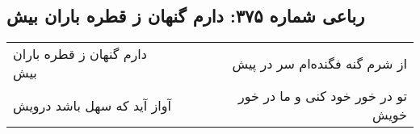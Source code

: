 \begin{center}
\section*{رباعی شماره ۳۷۵: دارم گنهان ز قطره باران بیش}
\label{sec:sh375}
\begin{longtable}{l p{0.5cm} r}
دارم گنهان ز قطره باران بیش
&&
از شرم گنه فگنده‌ام سر در پیش
\\
آواز آید که سهل باشد درویش
&&
تو در خور خود کنی و ما در خور خویش
\\
\end{longtable}
\end{center}
